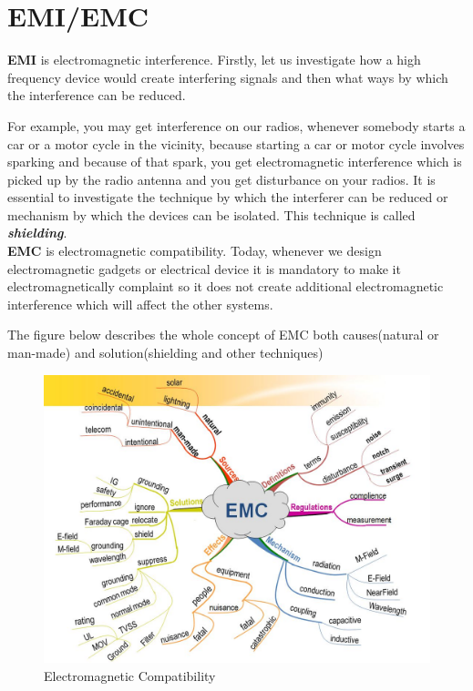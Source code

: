 \section{EMI/EMC}

\textbf{EMI} is electromagnetic interference.
Firstly, let us investigate how a high frequency device would create interfering signals and then what ways by which the interference can be reduced.

For example, you may get interference on our radios, whenever somebody starts a car or a motor cycle in the vicinity, because starting a car or motor cycle involves sparking and because of that spark, you get electromagnetic interference which is picked up by the radio antenna and you get disturbance on your radios. It is essential to investigate the technique by which the interferer can be reduced or mechanism by which the devices can be isolated. This technique is called \textit{\textbf{shielding}}.\\

\textbf{EMC} is electromagnetic compatibility. Today, whenever we design electromagnetic gadgets or electrical device it is mandatory to make it electromagnetically complaint so it does not create additional electromagnetic interference which will affect the other systems.

The figure below describes the whole concept of EMC both causes(natural or man-made) and solution(shielding and other techniques)
\begin{figure}[h]
\centering
\includegraphics[scale=0.35]{./graphics/634771461726914062}
\caption{Electromagnetic Compatibility}
\end{figure}